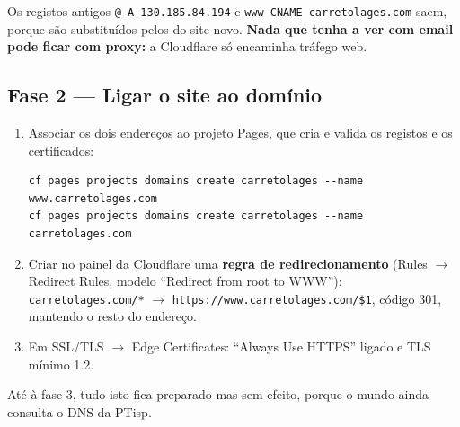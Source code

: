 \documentclass[11pt,a4paper]{article}
\begin{document}
Os registos antigos \texttt{@ A 130.185.84.194} e \texttt{www CNAME carretolages.com} saem, porque são
substituídos pelos do site novo. \textbf{Nada que tenha a ver com email pode ficar com proxy:} a Cloudflare
só encaminha tráfego web.

\subsection{Fase 2 --- Ligar o site ao domínio}
\begin{enumerate}
  \item Associar os dois endereços ao projeto Pages, que cria e valida os registos e os certificados:
\begin{verbatim}
cf pages projects domains create carretolages --name www.carretolages.com
cf pages projects domains create carretolages --name carretolages.com
\end{verbatim}
  \item Criar no painel da Cloudflare uma \textbf{regra de redirecionamento} (Rules $\rightarrow$ Redirect
        Rules, modelo ``Redirect from root to WWW''):\\
        \texttt{carretolages.com/*} $\rightarrow$ \texttt{https://www.carretolages.com/\$1}, código 301,
        mantendo o resto do endereço.
  \item Em SSL/TLS $\rightarrow$ Edge Certificates: ``Always Use HTTPS'' ligado e TLS mínimo 1.2.
\end{enumerate}
Até à fase 3, tudo isto fica preparado mas sem efeito, porque o mundo ainda consulta o DNS da PTisp.
\end{document}
